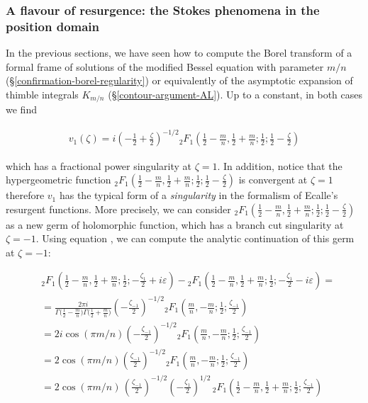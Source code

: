 \documentclass{article}
\theoremstyle{definition}
\begin{document}
\subsubsection{A flavour of resurgence: the Stokes phenomena in the position domain}\label{resurgence-AL}

In the previous sections, we have seen how to compute the Borel transform of a formal frame of solutions of the modified Bessel equation with parameter $m/n$ (\S\ref{confirmation-borel-regularity}) or equivalently of the asymptotic expansion of thimble integrals $K_{m/n}$ (\S\ref{contour-argument-AL}). Up to a constant, in both cases we find 

\begin{align*}
    v_1(\zeta)= i \left(-\frac{1}{2}+\frac{\zeta}{2}\right)^{-1/2} {}_2F_1\left(\frac{1}{2}-\frac{m}{n},\frac{1}{2}+\frac{m}{n};\frac{1}{2};\frac{1}{2}-\frac{\zeta}{2}\right)
\end{align*}

which has a fractional power singularity at $\zeta=1$. In addition, notice that the hypergeometric function ${}_2F_1\left(\frac{1}{2}-\frac{m}{n},\frac{1}{2}+\frac{m}{n};\frac{1}{2};\frac{1}{2}-\frac{\zeta}{2}\right)$ is convergent at $\zeta=1$ therefore $v_1$ has the typical form of a \textit{singularity} in the formalism of Ecalle's resurgent functions. More precisely, we can consider ${}_2F_1\left(\frac{1}{2}-\frac{m}{n},\frac{1}{2}+\frac{m}{n};\frac{1}{2};\frac{1}{2}-\frac{\zeta}{2}\right)$ as a new germ of holomorphic function, which has a branch cut singularity at $\zeta=-1$. Using equation \cite[15.2.3]{dlmf}, we can compute the analytic continuation of this germ at $\zeta=-1$: 

\begin{align*}
&{}_2F_1\left(\frac{1}{2}-\frac{m}{n},\frac{1}{2}+\frac{m}{n};\frac{1}{2};-\frac{\zeta_1}{2}+i\varepsilon\right)-{}_2F_1\left(\frac{1}{2}-\frac{m}{n},\frac{1}{2}+\frac{m}{n};\frac{1}{2};-\frac{\zeta_1}{2}-i\varepsilon\right)=\\
&=\frac{2\pi i}{\Gamma\big(\tfrac{1}{2}-\tfrac{m}{n}\big)\Gamma\big(\tfrac{1}{2}+\tfrac{m}{n}\big)} \left(-\frac{\zeta_{-1}}{2}\right)^{-1/2} {}_2F_1\left(\frac{m}{n},-\frac{m}{n};\frac{1}{2};\frac{\zeta_{-1}}{2}\right) \\
&=2 i\cos(\pi m/n) \left(-\frac{\zeta_{-1}}{2}\right)^{-1/2} {}_2F_1\left(\frac{m}{n},-\frac{m}{n};\frac{1}{2};\frac{\zeta_{-1}}{2}\right) \\
&=2\cos(\pi m/n) \left(\frac{\zeta_{-1}}{2}\right)^{-1/2} {}_2F_1\left(\frac{m}{n},-\frac{m}{n};\frac{1}{2};\frac{\zeta_{-1}}{2}\right) \\
&=2\cos(\pi m/n)\, \left(\frac{\zeta_{-1}}{2}\right)^{-1/2} \left(-\frac{\zeta_{1}}{2}\right)^{1/2}\, {}_2F_1\left(\frac{1}{2}-\frac{m}{n},\frac{1}{2}+\frac{m}{n};\frac{1}{2};\frac{\zeta_{-1}}{2}\right)
\end{align*}
\end{document}
